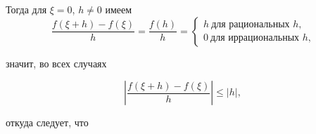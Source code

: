 \documentclass[12pt,cmcyralt]{book} %
\begin{document}
\noindent Тогда для $\xi = 0$, $h \neq 0$ имеем
$$\frac{f(\xi + h)-f(\xi)}{h} = \frac{f(h)}{h} = 
\begin{cases} 
h \  \text{для рациональных $h$,}\\
0 \ \text{для иррациональных $h$,}
\end{cases}$$ 

\newpage
\pagestyle{fancy} 
\noindent з\hspace{1 pt}н\hspace{1 pt}а\hspace{1 pt}ч\hspace{1 pt}и\hspace{1 pt}т\hspace{1 pt},\hspace{1 pt} \hspace{1 pt}в\hspace{1 pt}о\hspace{1 pt} \hspace{1 pt}в\hspace{1 pt}с\hspace{1 pt}е\hspace{1 pt}х\hspace{1 pt} \hspace{1 pt}с\hspace{1 pt}л\hspace{1 pt}у\hspace{1 pt}ч\hspace{1 pt}а\hspace{1 pt}я\hspace{1 pt}х 

\[
\left | \frac{f(\xi + h) - f(\xi)}{h} \right | \leqslant |h| ,
\]

\noindent о\hspace{1 pt}т\hspace{1 pt}к\hspace{1 pt}у\hspace{1 pt}д\hspace{1 pt}а\hspace{1 pt} \hspace{1 pt}с\hspace{1 pt}л\hspace{1 pt}е\hspace{1 pt}д\hspace{1 pt}у\hspace{1 pt}е\hspace{1 pt}т\hspace{1 pt},\hspace{1 pt} \hspace{1 pt}ч\hspace{1 pt}т\hspace{1 pt}о 
\end{document}
